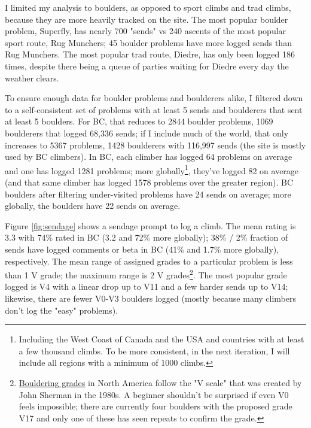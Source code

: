\documentclass[10pt]{article}
\begin{document}
I limited my analysis to boulders, as opposed to sport climbs and trad climbs, because they are more heavily tracked on the site. The most popular boulder problem, Superfly, has nearly 700 "sends" vs 240 ascents of the most popular sport route, Rug Munchers; 45 boulder problems have more logged sends than Rug Munchers. The most popular trad route, Diedre, has only been logged 186 times, despite there being a queue of parties waiting for Diedre every day the weather clears. 

To ensure enough data for boulder problems and boulderers alike, I filtered down to a self-consistent set of problems with at least 5 sends and boulderers that sent at least 5 boulders. For BC, that reduces to 2844 boulder problems, 1069 boulderers that logged 68,336 sends; if I include much of the world, that only increases to 5367 problems, 1428 boulderers with 116,997 sends (the site is mostly used by BC climbers). In BC, each climber has logged 64 problems on average and one has logged 1281 problems; more globally\footnote[3]{Including the West Coast of Canada and the USA and countries with at least a few thousand climbs. To be more consistent, in the next iteration, I will include all regions with a minimum of 1000 climbs.}, they've logged 82 on average (and that same climber has logged 1578 problems over the greater region). BC boulders after filtering under-visited problems have 24 sends on average; more globally, the boulders have 22 sends on average.

Figure \ref{fig:sendage} shows a sendage prompt to log a climb. The mean rating is 3.3 with 74\% rated in BC (3.2 and 72\% more globally); 38\% / 2\% fraction of sends have logged comments or beta in BC (41\% and 1.7\% more globally), respectively. The mean range of assigned grades to a particular problem is less than 1 V grade; the maximum range is 2 V grades\footnote[4]{\href{https://www.99boulders.com/bouldering-grades}{Bouldering grades} in North America follow the "V scale" that was created by John Sherman in the 1980s. A beginner shouldn't be surprised if even V0 feels impossible; there are currently four boulders with the proposed grade V17 and only one of these has seen repeats to confirm the grade.}. The most popular grade logged is V4 with a linear drop up to V11 and a few harder sends up to V14; likewise, there are fewer V0-V3 boulders logged (mostly because many climbers don't log the "easy" problems). 



\end{document}
